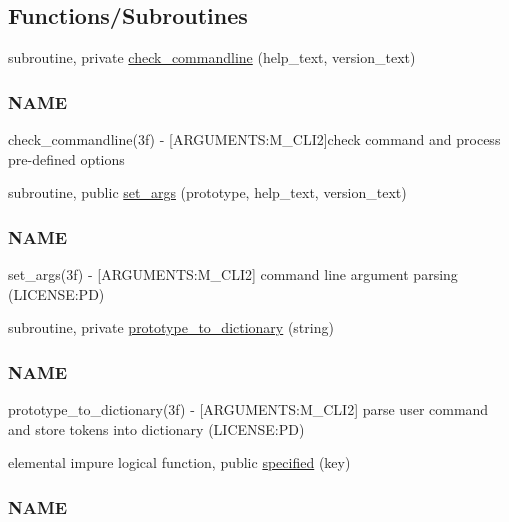 \subsection*{Functions/\+Subroutines}
\begin{DoxyCompactItemize}
\item 
subroutine, private \mbox{\hyperlink{namespacem__cli2_ada8b5e7a86778085f55821ec31c5977a}{check\+\_\+commandline}} (help\+\_\+text, version\+\_\+text)
\begin{DoxyCompactList}\small\item\em \subsubsection*{N\+A\+ME}

check\+\_\+commandline(3f) -\/ \mbox{[}A\+R\+G\+U\+M\+E\+N\+TS\+:M\+\_\+\+C\+L\+I2\mbox{]}check command and process pre-\/defined options \end{DoxyCompactList}\item 
subroutine, public \mbox{\hyperlink{namespacem__cli2_a6d20994aa80217dd3d0ffd1d5586f736}{set\+\_\+args}} (prototype, help\+\_\+text, version\+\_\+text)
\begin{DoxyCompactList}\small\item\em \subsubsection*{N\+A\+ME}

set\+\_\+args(3f) -\/ \mbox{[}A\+R\+G\+U\+M\+E\+N\+TS\+:M\+\_\+\+C\+L\+I2\mbox{]} command line argument parsing (L\+I\+C\+E\+N\+SE\+:PD) \end{DoxyCompactList}\item 
subroutine, private \mbox{\hyperlink{namespacem__cli2_a14896d00e509cbc32f4df993a8d6f75b}{prototype\+\_\+to\+\_\+dictionary}} (string)
\begin{DoxyCompactList}\small\item\em \subsubsection*{N\+A\+ME}

prototype\+\_\+to\+\_\+dictionary(3f) -\/ \mbox{[}A\+R\+G\+U\+M\+E\+N\+TS\+:M\+\_\+\+C\+L\+I2\mbox{]} parse user command and store tokens into dictionary (L\+I\+C\+E\+N\+SE\+:PD) \end{DoxyCompactList}\item 
elemental impure logical function, public \mbox{\hyperlink{namespacem__cli2_a90118f308a5120041a5862fca4740367}{specified}} (key)
\begin{DoxyCompactList}\small\item\em \subsubsection*{N\+A\+ME}


\end{DoxyCompactList}
\end{DoxyCompactItemize}
